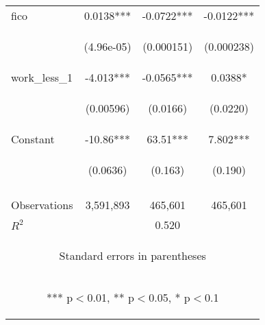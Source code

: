 \begin{center}
\begin{tabular}{lccc}
fico & 0.0138*** & -0.0722*** & -0.0122*** \\
\vspace{4pt} & \begin{footnotesize}(4.96e-05)\end{footnotesize} & \begin{footnotesize}(0.000151)\end{footnotesize} & \begin{footnotesize}(0.000238)\end{footnotesize} \\
work\_less\_1 & -4.013*** & -0.0565*** & 0.0388* \\
\vspace{4pt} & \begin{footnotesize}(0.00596)\end{footnotesize} & \begin{footnotesize}(0.0166)\end{footnotesize} & \begin{footnotesize}(0.0220)\end{footnotesize} \\
Constant & -10.86*** & 63.51*** & 7.802*** \\
 & \begin{footnotesize}(0.0636)\end{footnotesize} & \begin{footnotesize}(0.163)\end{footnotesize} & \begin{footnotesize}(0.190)\end{footnotesize} \\
\vspace{4pt} & \begin{footnotesize}\end{footnotesize} & \begin{footnotesize}\end{footnotesize} & \begin{footnotesize}\end{footnotesize} \\
Observations & 3,591,893 & 465,601 & 465,601 \\
 $R^2$ &  & 0.520 &  \\ \hline
\multicolumn{4}{c}{\begin{footnotesize} Standard errors in parentheses\end{footnotesize}} \\
\multicolumn{4}{c}{\begin{footnotesize} *** p$<$0.01, ** p$<$0.05, * p$<$0.1\end{footnotesize}} \\
\end{tabular}
\end{center}
